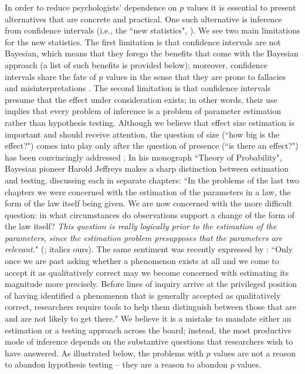 In order to reduce psychologists' dependence on $p$ values it is essential to present alternatives that are concrete and practical. One such alternative is inference from confidence intervals (i.e., the ``new statistics", ). We see two main limitations for the new statistics. The first limitation is that confidence intervals are not Bayesian, which means that they forego the benefits that come with the Bayesian approach (a list of such benefits is provided below); moreover, confidence intervals share the fate of $p$ values in the sense that they are prone to fallacies and misinterpretations \cite{GreenlandEtAlinpress,MoreyEtAl2016CI}. The second limitation is that confidence intervals presume that the effect under consideration exists; in other words, their use implies that every problem of inference is a problem of parameter estimation rather than hypothesis testing. Although we believe that effect size estimation is important and should receive attention, the question of size (``how big is the effect?") comes into play only after the question of presence (``is there an effect?") has been convincingly addressed \cite{MoreyEtAl2014}. In his monograph ``Theory of Probability", Bayesian pioneer Harold Jeffreys makes a sharp distinction between estimation and testing, discussing each in separate chapters: ``In the problems of the last two chapters we were concerned with the estimation of the parameters in a law, the form of the law itself being given. We are now concerned with the more difficult question: in what circumstances do observations support a change of the form of the law itself? \emph{This question is really logically prior to the estimation of the parameters, since the estimation problem presupposes that the parameters are relevant.}" (; italics ours). The same sentiment was recently expressed by : ``Only once we are past asking whether a phenomenon exists at all and we come to accept it as qualitatively correct may we become concerned with estimating its magnitude more precisely. Before lines of inquiry arrive at the privileged position of having identified a phenomenon that is generally accepted as qualitatively correct, researchers require tools to help them distinguish between those that are and are not likely to get there." We believe it is a mistake to mandate either an estimation or a testing approach across the board; instead, the most productive mode of inference depends on the substantive questions that researchers wish to have answered. As illustrated below, the problems with $p$ values are not a reason to abandon hypothesis testing -- they are a reason to abandon $p$ values.

